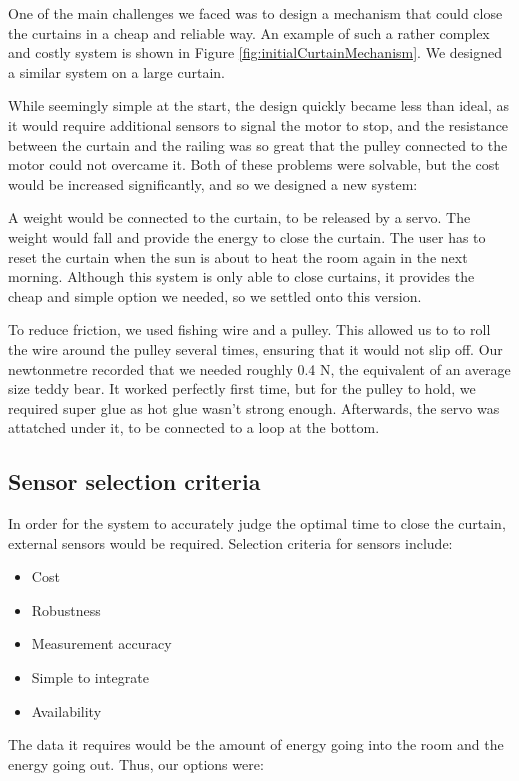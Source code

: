 \documentclass[a4paper,12pt]{article}
\begin{document}
One of the main challenges we faced was to design a mechanism that could close the curtains in a cheap and reliable way. 
An example of such a rather complex and costly system is shown in Figure \ref{fig:initialCurtainMechanism}.
We designed a similar system on a large curtain.

While seemingly simple at the start, the design quickly became less than ideal, as it would require additional sensors to signal the motor to stop, 
and the resistance between the curtain and the railing was so great that the pulley connected to the motor could not overcame it. Both of these problems were solvable, 
but the cost would be increased significantly, and so we designed a new system:

A weight would be connected to the curtain, to be released by a servo. The weight would fall and provide the energy to close the curtain. 
The user has to reset the curtain when the sun is about to heat the room again in the next morning. Although this system is only able to close curtains, 
it provides the cheap and simple option we needed, so we settled onto this version.

To reduce friction, we used fishing wire and a pulley. This allowed us to to roll the wire around the pulley several times, ensuring that it would not slip off. 
Our newtonmetre recorded that we needed roughly 0.4 N, the equivalent of an average size teddy bear. It worked perfectly first time, but for the pulley to hold, 
we required super glue as hot glue wasn't strong enough. Afterwards, the servo was attatched under it, to be connected to a loop at the bottom.


\subsection{Sensor selection criteria}

In order for the system to accurately judge the optimal time to close the curtain, external sensors would be required.
Selection criteria for sensors include:
\begin{itemize}
    \item Cost
    \item Robustness
    \item Measurement accuracy
    \item Simple to integrate
    \item Availability
\end{itemize}

The data it requires would be the amount of energy going into the room and the energy going out. Thus, our options were:
\end{document}
